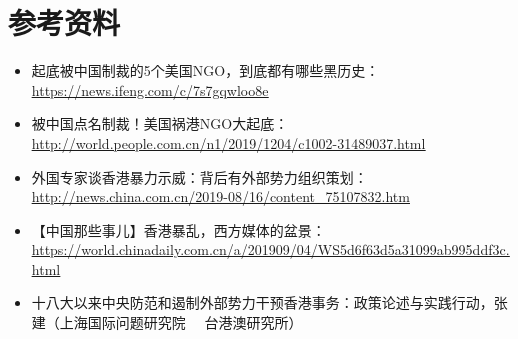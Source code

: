 \documentclass[a4paper,12pt,UTF8,twoside]{article}
\begin{document}
\section*{参考资料}

\begin{itemize}
  \item 起底被中国制裁的5个美国NGO，到底都有哪些黑历史：\\
  \href{https://news.ifeng.com/c/7s7gqwloo8e}{\underline{https://news.ifeng.com/c/7s7gqwloo8e}}
  \item 被中国点名制裁！美国祸港NGO大起底：\\
  \href{http://world.people.com.cn/n1/2019/1204/c1002-31489037.html}{\underline{http://world.people.com.cn/n1/2019/1204/c1002-31489037.html}}
  \item 外国专家谈香港暴力示威：背后有外部势力组织策划：\\
  \href{http://news.china.com.cn/2019-08/16/content_75107832.htm}{\underline{http://news.china.com.cn/2019-08/16/content\_75107832.htm}}
  \item 【中国那些事儿】香港暴乱，西方媒体的盆景：\\
  \href{world.chinadaily.com.cn/a/201909/04/WS5d6f63d5a31099ab995ddf3c.html}{\underline{https://world.chinadaily.com.cn/a/201909/04/WS5d6f63d5a31099ab995ddf3c.html}}
  \item 十八大以来中央防范和遏制外部势力干预香港事务：政策论述与实践行动，张建（上海国际问题研究院 \ \ 台港澳研究所）
\end{itemize}
\end{document}
